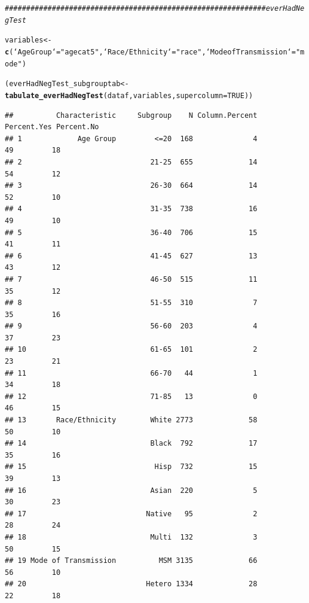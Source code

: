 \documentclass{article}\usepackage[]{graphicx}\usepackage[]{color}
\makeatletter
\newcommand{\hlnum}[1]{\textcolor[rgb]{0.686,0.059,0.569}{#1}}%
\newcommand{\hlstr}[1]{\textcolor[rgb]{0.192,0.494,0.8}{#1}}%
\newcommand{\hlcom}[1]{\textcolor[rgb]{0.678,0.584,0.686}{\textit{#1}}}%
\newcommand{\hlstd}[1]{\textcolor[rgb]{0.345,0.345,0.345}{#1}}%
\newcommand{\hlkwb}[1]{\textcolor[rgb]{0.69,0.353,0.396}{#1}}%
\newcommand{\hlkwc}[1]{\textcolor[rgb]{0.333,0.667,0.333}{#1}}%
\newcommand{\hlkwd}[1]{\textcolor[rgb]{0.737,0.353,0.396}{\textbf{#1}}}%
\newenvironment{kframe}{%
 \def\at@end@of@kframe{}%
 \ifinner\ifhmode%
  \def\at@end@of@kframe{\end{minipage}}%
  \begin{minipage}{\columnwidth}%
 \fi\fi%
 \def\FrameCommand##1{\hskip\@totalleftmargin \hskip-\fboxsep
 \colorbox{shadecolor}{##1}\hskip-\fboxsep
     \hskip-\linewidth \hskip-\@totalleftmargin \hskip\columnwidth}%
 \MakeFramed {\advance\hsize-\width
   \@totalleftmargin\z@ \linewidth\hsize
   \@setminipage}}%
 {\par\unskip\endMakeFramed%
 \at@end@of@kframe}
\newenvironment{knitrout}{}{} %
\makeatother
\begin{document}
\begin{knitrout}\footnotesize
{}\color{fgcolor}\begin{kframe}
\begin{alltt}
\hlcom{############################################################# everHadNegTest}

\hlstd{variables} \hlkwb{<-} \hlkwd{c}\hlstd{(}\hlkwc{`Age Group`} \hlstd{=} \hlstr{"agecat5"}\hlstd{,} \hlkwc{`Race/Ethnicity`} \hlstd{=} \hlstr{"race"}\hlstd{,} \hlkwc{`Mode of Transmission`} \hlstd{=} \hlstr{"mode"}\hlstd{)}

\hlstd{(everHadNegTest_subgrouptab} \hlkwb{<-} \hlkwd{tabulate_everHadNegTest}\hlstd{(dataf, variables,} \hlkwc{supercolumn} \hlstd{=} \hlnum{TRUE}\hlstd{))}
\end{alltt}
\begin{verbatim}
##          Characteristic     Subgroup    N Column.Percent Percent.Yes Percent.No
## 1             Age Group         <=20  168              4          49         18
## 2                              21-25  655             14          54         12
## 3                              26-30  664             14          52         10
## 4                              31-35  738             16          49         10
## 5                              36-40  706             15          41         11
## 6                              41-45  627             13          43         12
## 7                              46-50  515             11          35         12
## 8                              51-55  310              7          35         16
## 9                              56-60  203              4          37         23
## 10                             61-65  101              2          23         21
## 11                             66-70   44              1          34         18
## 12                             71-85   13              0          46         15
## 13       Race/Ethnicity        White 2773             58          50         10
## 14                             Black  792             17          35         16
## 15                              Hisp  732             15          39         13
## 16                             Asian  220              5          30         23
## 17                            Native   95              2          28         24
## 18                             Multi  132              3          50         15
## 19 Mode of Transmission          MSM 3135             66          56         10
## 20                            Hetero 1334             28          22         18

\end{verbatim}
\end{kframe}
\end{knitrout}
\end{document}
